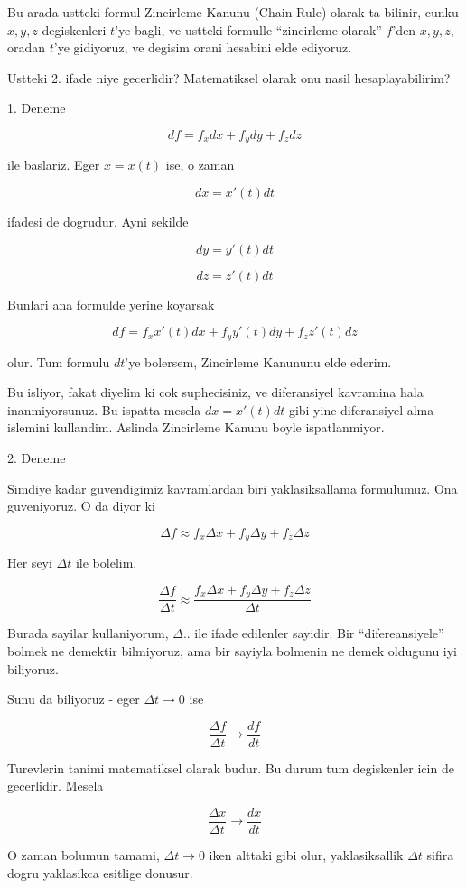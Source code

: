 \documentclass[12pt,fleqn]{article}\usepackage{../common}
\begin{document}
Bu arada ustteki formul Zincirleme Kanunu (Chain Rule) olarak ta bilinir,
cunku $x,y,z$ degiskenleri $t$'ye bagli, ve ustteki formulle ``zincirleme
olarak'' $f$'den $x,y,z$, oradan $t$'ye gidiyoruz, ve degisim orani
hesabini elde ediyoruz.

Ustteki 2. ifade niye gecerlidir? Matematiksel olarak onu nasil
hesaplayabilirim? 

1. Deneme

\[ df = f_xdx + f_ydy + f_zdz \]

ile baslariz. Eger $x=x(t)$ ise, o zaman

\[ dx = x'(t)dt \]

ifadesi de dogrudur. Ayni sekilde

\[ dy = y'(t)dt \]

\[ dz = z'(t)dt \]

Bunlari ana formulde yerine koyarsak

\[ df = f_xx'(t)dx + f_yy'(t)dy + f_zz'(t)dz \]

olur. Tum formulu $dt$'ye bolersem, Zincirleme Kanununu elde ederim. 

Bu isliyor, fakat diyelim ki cok suphecisiniz, ve diferansiyel kavramina
hala inanmiyorsunuz. Bu ispatta mesela $dx = x'(t)dt$ gibi yine
diferansiyel alma islemini kullandim. Aslinda Zincirleme Kanunu boyle
ispatlanmiyor. 

2. Deneme

Simdiye kadar guvendigimiz kavramlardan biri yaklasiksallama
formulumuz. Ona guveniyoruz. O da diyor ki 

\[ \Delta f \approx f_x\Delta x + f_y \Delta y + f_z \Delta z \]

Her seyi $\Delta t$ ile bolelim. 

\[ \frac{\Delta f}{\Delta t} \approx 
\frac{f_x\Delta x + f_y \Delta y + f_z \Delta z }{\Delta t}\]

Burada sayilar kullaniyorum, $\Delta ..$ ile ifade edilenler sayidir. Bir
``difereansiyele'' bolmek ne demektir bilmiyoruz, ama bir sayiyla bolmenin
ne demek oldugunu iyi biliyoruz. 

Sunu da biliyoruz - eger $\Delta t \to 0$ ise 

\[ \frac{\Delta f}{\Delta t} \to \frac{df}{dt} \]

Turevlerin tanimi matematiksel olarak budur. Bu durum tum degiskenler icin
de gecerlidir. Mesela

\[ \frac{\Delta x}{\Delta t} \to \frac{dx}{dt} \]

O zaman bolumun tamami, $\Delta t \to 0$ iken alttaki gibi olur,
yaklasiksallik $\Delta t$ sifira dogru yaklasikca esitlige donusur.
\end{document}
